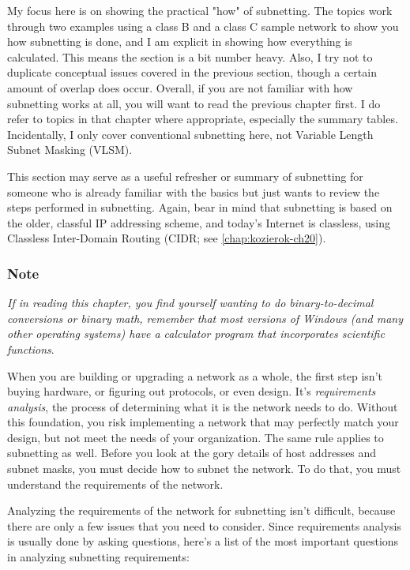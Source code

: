 \documentclass[b5paper,11pt]{memoir}
\begin{document}
My focus here is on showing the practical "how" of subnetting. The
topics work through two
\protect\hypertarget{ch19.htmlux5cux23idx-CHP-19-0746}{}{}examples using
a class B and a class C sample network to show you how subnetting is
done, and I am explicit in showing how everything is calculated. This
means the section is a bit number heavy. Also, I try not to duplicate
conceptual issues covered in the previous section, though a certain
amount of overlap does occur. Overall, if you are not familiar with how
subnetting works at all, you will want to read the previous chapter
first. I do refer to topics in that chapter where appropriate,
especially the summary tables. Incidentally, I only cover conventional
subnetting here, not Variable Length Subnet Masking (VLSM).

This section may serve as a useful refresher or summary of subnetting
\protect\hypertarget{ch19.htmlux5cux23idx-CHP-19-0747}{}{}for someone
who is already familiar with the basics but just wants to review the
steps performed in subnetting. Again, bear in mind that subnetting is
based on the older, classful IP addressing scheme, and today's Internet
is classless, using Classless Inter-Domain Routing (CIDR; see \vref{chap:kozierok-ch20}).

\subsubsection[Note]{\texorpdfstring{\protect\hypertarget{ch19.htmlux5cux23note-77}{}{}Note}{Note}}

{\emph{If in reading this chapter, you find yourself wanting to do
binary-to-decimal conversions or binary math, remember that most
versions of Windows (and many other operating systems) have a calculator
program that incorporates scientific functions}}.

When you are building or upgrading a network as a whole, the first step
isn't buying hardware, or figuring out protocols, or even design. It's
{\emph{requirements analysis}}, the process of determining what it is
the network needs to do. Without this foundation, you risk implementing
a network that may perfectly match your design, but not meet the needs
of your organization. The same rule applies to subnetting as well.
Before you look at the gory details of host addresses and subnet masks,
you must decide how to subnet the network. To do that, you must
understand the requirements of the network.

Analyzing the requirements of the network for subnetting isn't
difficult, because there are only a few issues that you need to
consider. Since requirements analysis is usually done by asking
questions, here's a list of the most important questions in analyzing
subnetting requirements:
\end{document}
